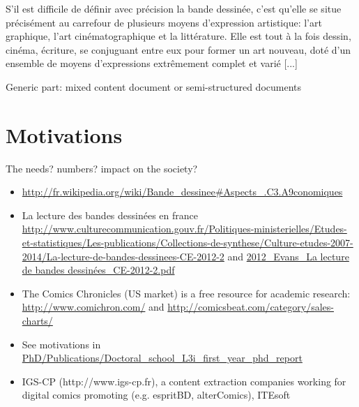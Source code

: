 S'il est difficile de définir avec précision la bande dessinée, c'est qu'elle se situe précisément au carrefour de plusieurs moyens d'expression artistique: l'art graphique, l'art cinématographique et la littérature. Elle est tout à la fois dessin, cinéma, écriture, se conjuguant entre eux pour former un art nouveau, doté d'un ensemble de moyens d'expressions extrêmement complet et varié [...]~\cite{duc1997art}

Generic part: mixed content document or semi-structured documents

\section{Motivations}
The needs? numbers? impact on the society?

\begin{itemize}
	\item \url{http://fr.wikipedia.org/wiki/Bande_dessinee#Aspects_.C3.A9conomiques}
	\item La lecture des bandes dessinées en france \url{http://www.culturecommunication.gouv.fr/Politiques-ministerielles/Etudes-et-statistiques/Les-publications/Collections-de-synthese/Culture-etudes-2007-2014/La-lecture-de-bandes-dessinees-CE-2012-2} and \url{2012_Evans_La lecture de bandes dessinées_CE-2012-2.pdf}
	\item The Comics Chronicles (US market) is a free resource for academic research: \url{http://www.comichron.com/} and \url{http://comicsbeat.com/category/sales-charts/}
	\item See motivations in \url{PhD/Publications/Doctoral_school_L3i_first_year_phd_report}
	\item IGS-CP (http://www.igs-cp.fr), a content extraction companies working for digital comics promoting (e.g. espritBD, alterComics), ITEsoft

\end{itemize}

